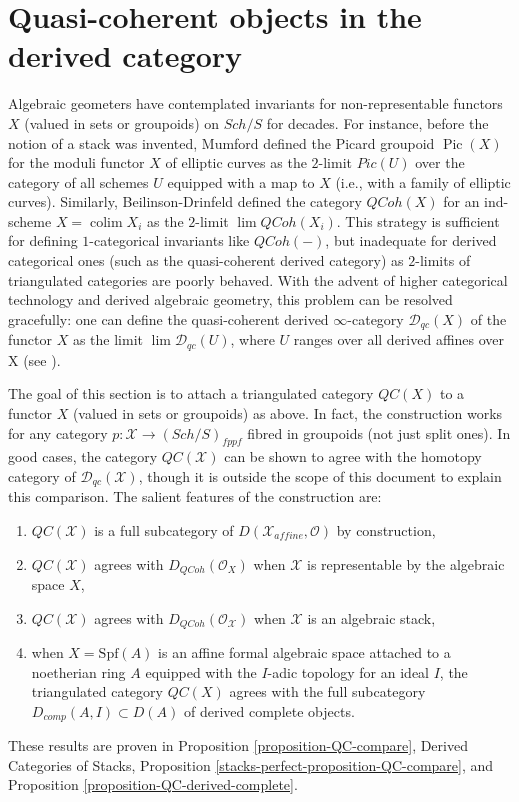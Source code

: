 \documentclass{stacks-project}
\theoremstyle{plain}
\theoremstyle{definition}
\theoremstyle{remark}
\numberwithin{equation}{subsection}
\def\lim{\mathop{\mathrm{lim}}\nolimits}
\def\colim{\mathop{\mathrm{colim}}\nolimits}
\def\Sch{\mathit{Sch}}
\def\QCoh{\mathit{QCoh}}
\def\Pic{\mathop{\mathrm{Pic}}\nolimits}
\begin{document}
\section{Quasi-coherent objects in the derived category}
\label{section-QC}

\noindent
Algebraic geometers have contemplated invariants for non-representable
functors $X$ (valued in sets or groupoids) on $\Sch/S$ for decades.
For instance,
before the notion of a stack was invented, Mumford defined \cite{mumford_picard}
the Picard groupoid $\Pic(X)$ for the moduli functor $X$ of elliptic curves
as the $2$-limit $Pic(U)$ over the category of all schemes $U$
equipped with a map to $X$ (i.e., with a family of elliptic curves).
Similarly, Beilinson-Drinfeld defined \cite{BVGD} the category
$\QCoh(X)$ for an ind-scheme $X = \colim X_i$ as the $2$-limit
$\lim \QCoh(X_i)$.
This strategy is sufficient for defining $1$-categorical invariants
like $\QCoh(-)$, but inadequate for derived categorical ones
(such as the quasi-coherent derived category) as $2$-limits
of triangulated categories are poorly behaved.
With the advent of higher categorical technology
and derived algebraic geometry, this problem can be
resolved gracefully: one can define the quasi-coherent
derived $\infty$-category $\mathcal{D}_{qc}(X)$ of the functor $X$
as the limit $\lim \mathcal{D}_{qc}(U)$, where $U$
ranges over all derived affines over X (see \cite{lurie-thesis}).

\medskip\noindent
The goal of this section is to attach a triangulated category
$\mathit{QC}(X)$ to a functor $X$ (valued in sets or groupoids)
as above. In fact, the construction works for any category
$p : \mathcal{X} \to (\Sch/S)_{fppf}$ fibred in groupoids
(not just split ones). In good cases, the category $\mathit{QC}(\mathcal{X})$
can be shown to agree with the homotopy category of
$\mathcal{D}_{qc}(\mathcal{X})$,
though it is outside the scope of this document to explain this comparison.
The salient features of the construction are:
\begin{enumerate}
\item[(a)] $\mathit{QC}(\mathcal{X})$ is a full subcategory of
$D(\mathcal{X}_{affine}, \mathcal{O})$ by construction,
\item[(b)] $\mathit{QC}(\mathcal{X})$ agrees with $D_\QCoh(\mathcal{O}_X)$
when $\mathcal{X}$ is representable by the algebraic space $X$, 
\item[(c)] $\mathit{QC}(\mathcal{X})$ agrees with
$D_\QCoh(\mathcal{O}_\mathcal{X})$ when $\mathcal{X}$ is an algebraic stack,
\item[(d)] when $X = \text{Spf}(A)$ is an affine formal algebraic space
attached to a noetherian ring $A$ equipped with the $I$-adic topology
for an ideal $I$, the triangulated category
$\mathit{QC}(X)$ agrees with the full subcategory
$D_{comp}(A, I) \subset D(A)$ of derived complete objects.
\end{enumerate}
These results are proven in
Proposition \ref{proposition-QC-compare},
Derived Categories of Stacks, Proposition
\ref{stacks-perfect-proposition-QC-compare}, and
Proposition \ref{proposition-QC-derived-complete}.
\end{document}
